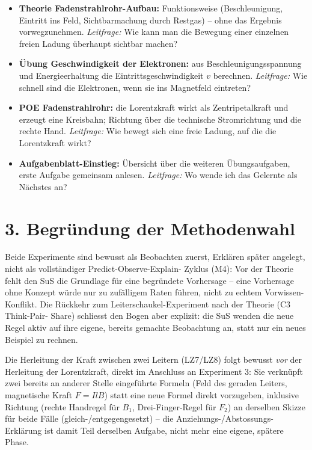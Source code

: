 \documentclass[11pt,a4paper]{article}
\begin{document}
\begin{itemize}[leftmargin=1.3cm,itemsep=0.3em]
  bekannten magnetischen Kraft $F=IlB$ zeigen, dass auf jeden einzelnen
  Ladungsträger die Lorentzkraft $F_N=qvB$ entfällt.
  \emph{Leitfrage:} Warum wirkt die Kraft überhaupt auf den ganzen Leiter
  -- was passiert dabei auf der Ebene der einzelnen Ladungen?
  \item \textbf{Theorie Fadenstrahlrohr-Aufbau:} Funktionsweise
  (Beschleunigung, Eintritt ins Feld, Sichtbarmachung durch Restgas) --
  ohne das Ergebnis vorwegzunehmen. \emph{Leitfrage:} Wie kann man die
  Bewegung einer einzelnen freien Ladung überhaupt sichtbar machen?
  \item \textbf{Übung Geschwindigkeit der Elektronen:} aus
  Beschleunigungsspannung und Energieerhaltung die Eintrittsgeschwindigkeit
  $v$ berechnen. \emph{Leitfrage:} Wie schnell sind die Elektronen, wenn
  sie ins Magnetfeld eintreten?
  \item \textbf{POE Fadenstrahlrohr:} die Lorentzkraft wirkt als
  Zentripetalkraft und erzeugt eine Kreisbahn; Richtung über die
  technische Stromrichtung und die rechte Hand. \emph{Leitfrage:} Wie
  bewegt sich eine freie Ladung, auf die die Lorentzkraft wirkt?
  \item \textbf{Aufgabenblatt-Einstieg:} Übersicht über die weiteren
  Übungsaufgaben, erste Aufgabe gemeinsam anlesen. \emph{Leitfrage:} Wo
  wende ich das Gelernte als Nächstes an?
\end{itemize}

\section*{3. Begründung der Methodenwahl}

Beide Experimente sind bewusst als \glqq Beobachten zuerst, Erklären
später\grqq{} angelegt, nicht als vollständiger Predict-Observe-Explain-
Zyklus (M4): Vor der Theorie fehlt den SuS die Grundlage für eine
begründete Vorhersage -- eine Vorhersage ohne Konzept würde nur zu
zufälligem Raten führen, nicht zu echtem Vorwissen-Konflikt. Die
Rückkehr zum Leiterschaukel-Experiment nach der Theorie (C3 Think-Pair-
Share) schliesst den Bogen aber explizit: die SuS wenden die neue Regel
aktiv auf ihre eigene, bereits gemachte Beobachtung an, statt nur ein
neues Beispiel zu rechnen.

Die Herleitung der Kraft zwischen zwei Leitern (LZ7/LZ8) folgt bewusst
\emph{vor} der Herleitung der Lorentzkraft, direkt im Anschluss an
Experiment 3: Sie verknüpft zwei bereits an anderer Stelle eingeführte
Formeln (Feld des geraden Leiters, magnetische Kraft $F=IlB$) statt eine
neue Formel direkt vorzugeben, inklusive Richtung (rechte Handregel für
$B_1$, Drei-Finger-Regel für $F_2$) an derselben Skizze für beide Fälle
(gleich-/entgegengesetzt) -- die Anziehungs-/Abstossungs-Erklärung ist
damit Teil derselben Aufgabe, nicht mehr eine eigene, spätere Phase.
\end{document}
